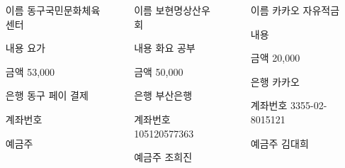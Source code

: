 \documentclass[	25pt, 
							a0paper, 
							portrait, %
							margin=0mm, %
							innermargin=10mm,  		%
							blockverticalspace=4mm, %
							colspace=5mm, 
							subcolspace=0mm
							]{tikzposter}
\begin{document}
\begin{columns}
		{
			\setlength{\leftmargini}{7em}			
			\setlength{\labelsep}{1em} %
			\begin{LARGE}
			\begin{itemize}
			\item [이름] 동구국민문화체육센터
			\item [내용] 요가
			\item [금액] 53,000
			\item [은행] 동구 페이 결제
			\item [계좌번호] 
			\item [예금주] 
			\end{itemize}
			\end{LARGE}
		}		

		{
			\setlength{\leftmargini}{7em}			
			\setlength{\labelsep}{1em} %
			\begin{LARGE}
			\begin{itemize}
			\item [이름] 보현명상산우회
			\item [내용] 화요 공부
			\item [금액] 50,000 
			\item [은행] 부산은행
			\item [계좌번호] 105120577363
			\item [예금주] 조희진
			\end{itemize}
			\end{LARGE}
		}		

		{
			\setlength{\leftmargini}{7em}			
			\setlength{\labelsep}{1em} %
			\begin{LARGE}
			\begin{itemize}
			\item [이름] 카카오 자유적금
			\item [내용] 
			\item [금액] 20,000 
			\item [은행] 카카오
			\item [계좌번호] 3355-02-8015121
			\item [예금주] 김대희
			\end{itemize}
			\end{LARGE}
		}		



	\end{columns}
\end{document}

